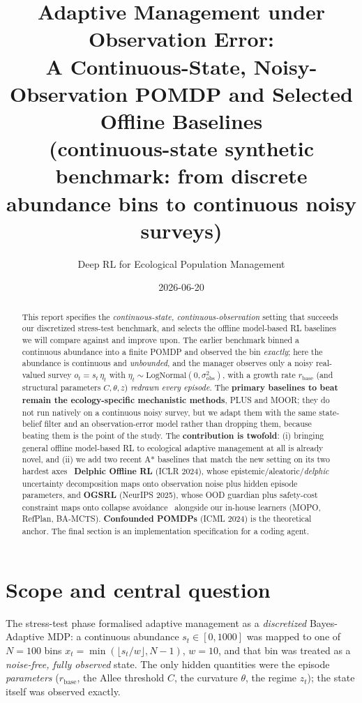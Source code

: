 \documentclass[11pt]{article}
\title{Adaptive Management under Observation Error:\\
A Continuous-State, Noisy-Observation POMDP and Selected Offline Baselines\\
\large (continuous-state synthetic benchmark: from discrete abundance bins to continuous noisy surveys)}
\author{Deep RL for Ecological Population Management}
\date{2026-06-20}
\newcommand{\rbase}{r_{\mathrm{base}}}
\newcommand{\sobs}{\sigma_{\mathrm{obs}}}
\begin{document}
\maketitle

\begin{abstract}
This report specifies the \emph{continuous-state, continuous-observation} setting
that succeeds our discretized stress-test benchmark, and selects the offline
model-based RL baselines we will compare against and improve upon. The earlier
benchmark binned a continuous abundance into a finite POMDP and observed the bin
\emph{exactly}; here the abundance is continuous and \emph{unbounded}, and the
manager observes only a noisy real-valued survey $o_t = s_t\,\eta_t$ with
$\eta_t \sim \mathrm{LogNormal}(0,\sobs^2)$, with a growth rate $\rbase$ (and
structural parameters $C,\theta,z$) \emph{redrawn every episode}. The
\textbf{primary baselines to beat remain the ecology-specific mechanistic methods},
PLUS and MOOR; they do not run natively on a continuous noisy survey, but we adapt
them with the same state-belief filter and an observation-error model rather than
dropping them, because beating them is the point of the study. The
\textbf{contribution is twofold}: (i) bringing general offline model-based RL to
ecological adaptive management at all is already novel, and (ii) we add two recent
A* baselines that match the new setting on its two hardest axes \textemdash\
\textbf{Delphic Offline RL} (ICLR 2024), whose epistemic/aleatoric/\emph{delphic}
uncertainty decomposition maps onto observation noise plus hidden episode
parameters, and \textbf{OGSRL} (NeurIPS 2025), whose OOD guardian plus safety-cost
constraint maps onto collapse avoidance \textemdash\ alongside our in-house
learners (MOPO, RefPlan, BA-MCTS). \textbf{Confounded POMDPs} (ICML 2024) is the
theoretical anchor. The final section is an implementation specification for a
coding agent.
\end{abstract}

\section{Scope and central question}
The stress-test phase formalised adaptive management as a \emph{discretized}
Bayes-Adaptive MDP: a continuous abundance $s_t \in [0,1000]$ was mapped to one of
$N{=}100$ bins $x_t = \min(\lfloor s_t/w \rfloor, N{-}1)$, $w{=}10$, and that bin
was treated as a \emph{noise-free, fully observed} state. The only hidden
quantities were the episode \emph{parameters} ($\rbase$, the Allee threshold $C$,
the curvature $\theta$, the regime $z_t$); the state itself was observed exactly.
\end{document}
